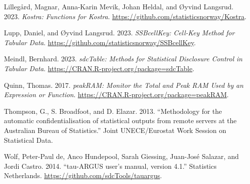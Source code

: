 \begin{CSLReferences}{1}{0}
\leavevmode{}%
Lillegård, Magnar, Anna-Karin Mevik, Johan Heldal, and Øyvind Langsrud. 2023. \emph{{Kostra}: Functions for Kostra}. \url{https://github.com/statisticsnorway/Kostra}.

\leavevmode{}%
Lupp, Daniel, and Øyvind Langsrud. 2023. \emph{{SSBcellKey}: Cell-Key Method for Tabular Data}. \url{https://github.com/statisticsnorway/SSBcellKey}.

\leavevmode{}%
Meindl, Bernhard. 2023. \emph{{sdcTable}: Methods for Statistical Disclosure Control in Tabular Data}. \url{https://CRAN.R-project.org/package=sdcTable}.

\leavevmode{}%
Quinn, Thomas. 2017. \emph{{peakRAM}: Monitor the Total and Peak RAM Used by an Expression or Function}. \url{https://CRAN.R-project.org/package=peakRAM}.

\leavevmode{}%
Thompson, G., S. Broadfoot, and D. Elazar. 2013. {``{Methodology for the automatic confidentialisation of statistical outputs from remote servers at the Australian Bureau of Statistics}.''} {Joint UNECE/Eurostat Work Session on Statistical Data}.

\leavevmode{}%
Wolf, Peter-Paul de, Anco Hundepool, Sarah Giessing, Juan-José Salazar, and Jordi Castro. 2014. {``{tau-ARGUS user's manual, version 4.1}.''} Statistics Netherlands. \url{https://github.com/sdcTools/tauargus}.

\end{CSLReferences}



\address{%
Øyvind Langsrud\\
Statistics Norway\\%
P.O. Box 8131 Dep.,\\ 0033 Oslo, Norway\\
%
\url{https://github.com/olangsrud}\\%
\textit{ORCiD: \href{https://orcid.org/0000-0002-1380-4396}{0000-0002-1380-4396}}\\%
\href{mailto:Oyvind.Langsrud@ssb.no}{\nolinkurl{Oyvind.Langsrud@ssb.no}}%
}
